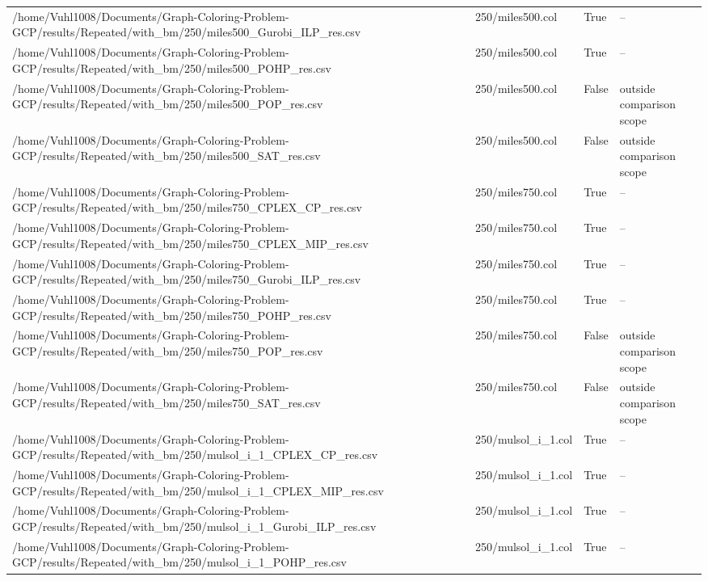 \begin{table}[htbp]
\begin{tabular}{llll}
/home/Vuhl1008/Documents/Graph-Coloring-Problem-GCP/results/Repeated/with\_bm/250/miles500\_Gurobi\_ILP\_res.csv & 250/miles500.col & True & -- \\
/home/Vuhl1008/Documents/Graph-Coloring-Problem-GCP/results/Repeated/with\_bm/250/miles500\_POHP\_res.csv & 250/miles500.col & True & -- \\
/home/Vuhl1008/Documents/Graph-Coloring-Problem-GCP/results/Repeated/with\_bm/250/miles500\_POP\_res.csv & 250/miles500.col & False & outside comparison scope \\
/home/Vuhl1008/Documents/Graph-Coloring-Problem-GCP/results/Repeated/with\_bm/250/miles500\_SAT\_res.csv & 250/miles500.col & False & outside comparison scope \\
/home/Vuhl1008/Documents/Graph-Coloring-Problem-GCP/results/Repeated/with\_bm/250/miles750\_CPLEX\_CP\_res.csv & 250/miles750.col & True & -- \\
/home/Vuhl1008/Documents/Graph-Coloring-Problem-GCP/results/Repeated/with\_bm/250/miles750\_CPLEX\_MIP\_res.csv & 250/miles750.col & True & -- \\
/home/Vuhl1008/Documents/Graph-Coloring-Problem-GCP/results/Repeated/with\_bm/250/miles750\_Gurobi\_ILP\_res.csv & 250/miles750.col & True & -- \\
/home/Vuhl1008/Documents/Graph-Coloring-Problem-GCP/results/Repeated/with\_bm/250/miles750\_POHP\_res.csv & 250/miles750.col & True & -- \\
/home/Vuhl1008/Documents/Graph-Coloring-Problem-GCP/results/Repeated/with\_bm/250/miles750\_POP\_res.csv & 250/miles750.col & False & outside comparison scope \\
/home/Vuhl1008/Documents/Graph-Coloring-Problem-GCP/results/Repeated/with\_bm/250/miles750\_SAT\_res.csv & 250/miles750.col & False & outside comparison scope \\
/home/Vuhl1008/Documents/Graph-Coloring-Problem-GCP/results/Repeated/with\_bm/250/mulsol\_i\_1\_CPLEX\_CP\_res.csv & 250/mulsol\_i\_1.col & True & -- \\
/home/Vuhl1008/Documents/Graph-Coloring-Problem-GCP/results/Repeated/with\_bm/250/mulsol\_i\_1\_CPLEX\_MIP\_res.csv & 250/mulsol\_i\_1.col & True & -- \\
/home/Vuhl1008/Documents/Graph-Coloring-Problem-GCP/results/Repeated/with\_bm/250/mulsol\_i\_1\_Gurobi\_ILP\_res.csv & 250/mulsol\_i\_1.col & True & -- \\
/home/Vuhl1008/Documents/Graph-Coloring-Problem-GCP/results/Repeated/with\_bm/250/mulsol\_i\_1\_POHP\_res.csv & 250/mulsol\_i\_1.col & True & -- \\

\end{tabular}
\end{table}
